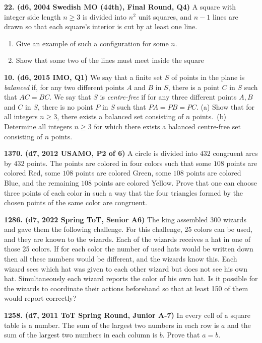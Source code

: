 \documentclass{article}
\begin{document}
        \textbf{22. (\color{red}d6\color{black}, 2004 Swedish MO (44th), Final Round, Q4)} A square with integer side length $n \geq 3$ is divided into $n^2$ unit squares, and $n-1$ lines are drawn so that each square's interior is cut by at least one line. \begin{enumerate} \item Give an example of such a configuration for some $n$. \item Show that some two of the lines must meet inside the square \end{enumerate}

        \textbf{10. (\color{red}d6\color{black}, 2015 IMO, Q1)} We say that a finite set $S$ of points in the plane is \textit{balanced} if, for any two different points $A$ and $B$ in $S$, there is a point $C$ in $S$ such that $AC = BC$. We say that $S$ is \textit{centre-free} if for any three different points $A, B$ and $C$ in $S$, there is no point $P$ in $S$ such that $PA = PB = PC$. (a) Show that for all integers $n \geq 3$, there exists a balanced set consisting of $n$ points.\
        (b) Determine all integers $n \geq 3$ for which there exists a balanced centre-free set consisting of $n$ points.

        \textbf{1370. (\color{red}d7\color{black}, 2012 USAMO, P2 of 6)} A circle is divided into $432$ congruent arcs by $432$ points. The points are colored in four colors such that some $108$ points are colored Red, some $108$ points are colored Green, some $108$ points are colored Blue, and the remaining $108$ points are colored Yellow. Prove that one can choose three points of each color in such a way that the four triangles formed by the chosen points of the same color are congruent.

        \textbf{1286. (\color{red}d7\color{black}, 2022 Spring ToT, Senior A6)} The king assembled 300 wizards and gave them the following challenge. For this challenge, 25 colors can be used, and they are known to the wizards. Each of the wizards receives a hat in one of those 25 colors. If for each color the number of used hats would be written down then all these numbers would be different, and the wizards know this. Each wizard sees which hat was given to each other wizard but does not see his own hat. Simultaneously each wizard reports the color of his own hat. Is it possible for the wizards to coordinate their actions beforehand so that at least 150 of them would report correctly?

        \textbf{1258. (\color{red}d7\color{black}, 2011 ToT Spring Round, Junior A-7)} In every cell of a square table is a number. The sum of the largest two numbers in each row is $a$ and the sum of the largest two numbers  in each column is $b$. Prove that $a=b$.
\end{document}
